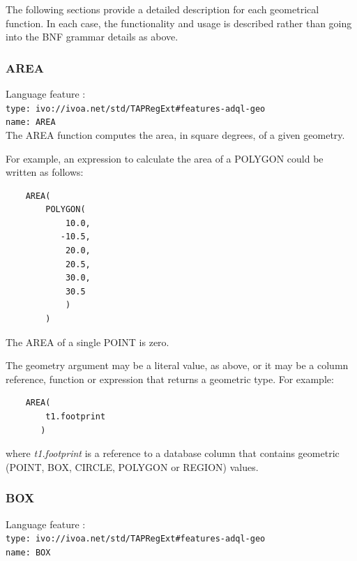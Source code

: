 \documentclass[11pt,a4paper]{ivoa}
\begin{document}
\clearpage
\label{sec:functions.geom.definitions}

The following sections provide a detailed description for each geometrical
function. In each case, the functionality and usage is described rather
than going into the BNF grammar details as above.

\subsubsection{AREA}
\label{sec:functions.geom.area}
{\footnotesize Language feature :}\\
{\footnotesize \verb|type: ivo://ivoa.net/std/TAPRegExt#features-adql-geo|}\\
{\footnotesize \verb|name: AREA|}\\

The AREA function computes the area, in square degrees, of a given geometry.

For example, an expression to calculate the area of a POLYGON could be
written as follows:
\begin{verbatim}
    AREA(
        POLYGON(
            10.0,
           -10.5,
            20.0,
            20.5,
            30.0,
            30.5
            )
        )
\end{verbatim}

The AREA of a single POINT is zero.

The geometry argument may be a literal value, as above, or it may be a
column reference, function or expression that returns a geometric type.
For example:
\begin{verbatim}
    AREA(
        t1.footprint
       )
\end{verbatim}
where \textit{t1.footprint} is a reference to a database column that
contains geometric (POINT, BOX, CIRCLE, POLYGON or REGION) values.

\subsubsection{BOX}
\label{sec:functions.geom.box}
{\footnotesize Language feature :}\\
{\footnotesize \verb|type: ivo://ivoa.net/std/TAPRegExt#features-adql-geo|}\\
{\footnotesize \verb|name: BOX|}\\
\end{document}
